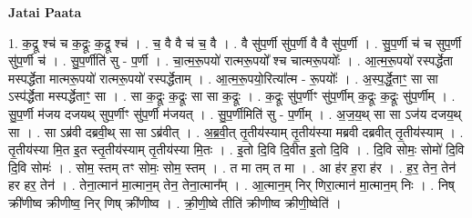 \documentclass[17pt]{extarticle}
\begin{document}
\textbf{Jatai Paata} \newline

1. क॒द्रू श्च॑ च क॒द्रूः क॒द्रू श्च॑ । . च॒ वै वै च॑ च॒ वै । . वै सु॑प॒र्णी सु॑प॒र्णी वै वै सु॑प॒र्णी । . सु॒प॒र्णी च॑ च सुप॒र्णी सु॑प॒र्णी च॑ । . सु॒प॒र्णीति॑ सु - प॒र्णी । . चा॒त्म॒रू॒पयो॑ रात्मरू॒पयो᳚ श्च चात्मरू॒पयोः᳚ । . आ॒त्म॒रू॒पयो॑ रस्पर्द्धेता मस्पर्द्धेता मात्मरू॒पयो॑ रात्मरू॒पयो॑ रस्पर्द्धेताम् । . आ॒त्म॒रू॒पयो॒रित्या᳚त्म - रू॒पयोः᳚ । . अ॒स्प॒र्द्धे॒ताꣳ॒॒ सा सा ऽस्प॑र्द्धेता मस्पर्द्धेताꣳ॒॒ सा । . सा क॒द्रूः क॒द्रूः सा सा क॒द्रूः । . क॒द्रूः सु॑प॒र्णीꣳ सु॑प॒र्णीम् क॒द्रूः क॒द्रूः सु॑प॒र्णीम् । . सु॒प॒र्णी म॑जय दजयथ् सुप॒र्णीꣳ सु॑प॒र्णी म॑जयत् । . सु॒प॒र्णीमिति॑ सु - प॒र्णीम् । . अ॒ज॒य॒थ् सा सा ऽज॑य दजय॒थ् सा । . सा ऽब्र॑वी दब्रवी॒थ् सा सा ऽब्र॑वीत् । . अ॒ब्र॒वी॒त् तृ॒तीय॑स्याम् तृ॒तीय॑स्या मब्रवी दब्रवीत् तृ॒तीय॑स्याम् । . तृ॒तीय॑स्या मि॒त इ॒त स्तृ॒तीय॑स्याम् तृ॒तीय॑स्या मि॒तः । . इ॒तो दि॒वि दि॒वीत इ॒तो दि॒वि । . दि॒वि सोमः॒ सोमो॑ दि॒वि दि॒वि सोमः॑ । . सोम॒ स्तम् तꣳ सोमः॒ सोम॒ स्तम् । . त मा तम् त मा । . आ ह॑र ह॒रा ह॑र । . ह॒र॒ तेन॒ तेन॑ हर हर॒ तेन॑ । . तेना॒त्मान॑ मा॒त्मान॒म् तेन॒ तेना॒त्मान᳚म् । . आ॒त्मान॒म् निर् णिरा॒त्मान॑ मा॒त्मान॒म् निः । . निष् क्री॑णीष्व क्रीणीष्व॒ निर् णिष् क्री॑णीष्व । . क्री॒णी॒ष्वे तीति॑ क्रीणीष्व क्रीणी॒ष्वेति॑ । \newline
\end{document}
